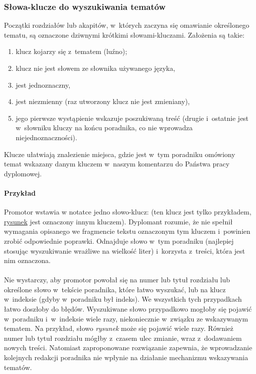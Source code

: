 \subsubsection{Słowa-klucze do wyszukiwania tematów}
\label{sec:dod:klucze}

Początki rozdziałów lub akapitów, w~których zaczyna się omawianie określonego tematu, są oznaczone dziwnymi krótkimi słowami-kluczami. Założenia są takie:
\begin{enumerate}
\item klucz kojarzy się z~tematem (luźno); 
\item klucz nie jest słowem ze słownika używanego języka, 
\item jest jednoznaczny, 
\item\label{itm:dod:zalozenie-niezmiennosci} jest niezmienny (raz utworzony klucz nie jest zmieniany), 
\item jego pierwsze wystąpienie wskazuje poszukiwaną treść (drugie i~ostatnie jest w~słowniku kluczy na końcu poradnika, co nie wprowadza niejednoznaczności). 
\end{enumerate} Klucze ułatwiają znalezienie miejsca, gdzie jest w~tym poradniku omówiony temat wskazany danym kluczem w~naszym komentarzu do Państwa pracy dyplomowej.


\paragraph{Przykład}Promotor wstawia w notatce jedno słowo-klucz:  (ten klucz jest tylko przykładem, \hyperref[sec:dod:rysunek]{rysunek} jest oznaczony innym kluczem). Dyplomant rozumie, że nie spełnił wymagania opisanego we fragmencie tekstu oznaczonym tym kluczem i~powinien zrobić odpowiednie poprawki. Odnajduje słowo  w~tym poradniku (najlepiej stosując wyszukiwanie wrażliwe na wielkość liter) i~korzysta z~treści, która jest nim oznaczona.


\paragraph{}\hspace{.25\parindent}Nie wystarczy, aby promotor powołał się na numer lub tytuł rozdziału lub określone słowo w~tekście poradnika, które łatwo wyszukać, lub na klucz w~indeksie (gdyby w~poradniku był indeks). We wszystkich tych przypadkach łatwo doszłoby do błędów. Wyszukiwane słowo przypadkowo mogłoby się pojawić w~poradniku i~w~indeksie wiele razy, niekoniecznie w~związku ze wskazywanym tematem. Na przykład, słowo {\em rysunek} może się pojawić wiele razy. Również numer lub tytuł rozdziału mógłby z~czasem ulec zmianie, wraz z~dodawaniem nowych treści. Natomiast zaproponowane rozwiązanie zapewnia, że wprowadzanie kolejnych redakcji poradnika nie wpłynie na działanie mechanizmu wskazywania tematów.


